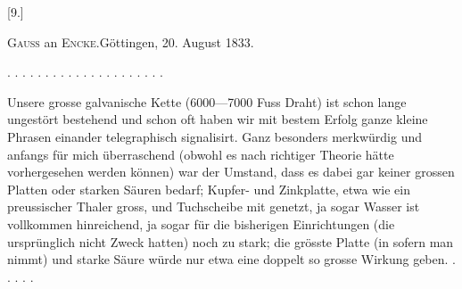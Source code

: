 \clearpage\begingroup{}
\begin{center}[9.]\end{center}
\begin{center}\textsc{Gauss} an \textsc{Encke}.\quad Göttingen, 20. August 1833.\end{center}
\noindent . . . . . . . . . . . . . . . . . . . . .\par
\indent Unsere grosse galvanische Kette (6000—7000 Fuss Draht) ist schon lange
ungestört bestehend und schon oft haben wir mit bestem Erfolg ganze kleine
Phrasen einander telegraphisch signalisirt. Ganz besonders merkwürdig und
anfangs für mich überraschend (obwohl es nach richtiger Theorie hätte vorhergesehen
werden können) war der Umstand, dass es dabei gar keiner grossen
Platten oder starken Säuren bedarf;  Kupfer- und Zinkplatte, etwa wie
ein preussischer Thaler gross, und Tuchscheibe mit 
genetzt, ja sogar  Wasser ist vollkommen hinreichend, ja sogar
für die bisherigen Einrichtungen (die ursprünglich nicht  Zweck hatten)
noch zu stark; die grösste Platte (in sofern man  nimmt) und
starke Säure würde nur etwa eine doppelt so grosse Wirkung geben. . . . . .
\clearpage\endgroup
